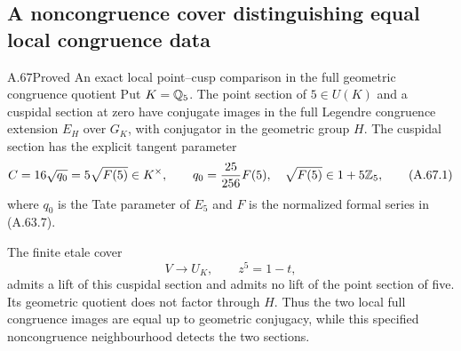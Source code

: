 \subsection{A noncongruence cover distinguishing equal local congruence data}

\begin{statement}{A.67}{Proved}
{An exact local point--cusp comparison in the full geometric congruence quotient}
Put $K=\mathbb Q_5$.  The point section of $5\in U(K)$ and a
cuspidal section at zero have conjugate images in the full
Legendre congruence extension $E_H$ over $G_K$, with
conjugator in the geometric group $H$.
The cuspidal section has the explicit tangent parameter
\[
                 C=16\sqrt{q_0}=5\sqrt{F(5)}\in K^\times,
 \qquad q_0=\frac{25}{256}F(5),\quad
                       \sqrt{F(5)}\in1+5\mathbb Z_5,
\tag{A.67.1}
\]
where $q_0$ is the Tate parameter of $E_5$ and $F$ is
the normalized formal series in (A.63.7).

The finite etale cover
\[
                  V\longrightarrow U_K,
                       \qquad z^5=1-t,
\tag{A.67.2}
\]
admits a lift of this cuspidal section and admits no lift
of the point section of five.  Its geometric quotient
does not factor through $H$.  Thus the two local full
congruence images are equal up to geometric conjugacy,
while this specified noncongruence neighbourhood detects
the two sections.
\end{statement}
